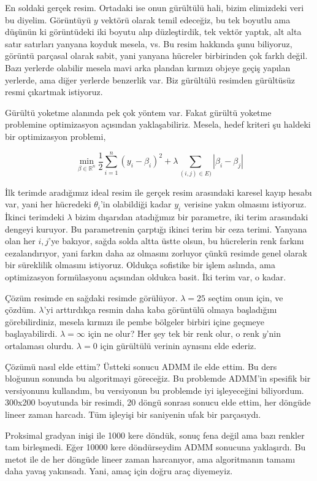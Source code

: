 \documentclass[12pt,fleqn]{article}\usepackage{../../common}
\begin{document}
En soldaki gerçek resim. Ortadaki ise onun gürültülü hali, bizim elimizdeki
veri bu diyelim. Görüntüyü $y$ vektörü olarak temil edeceğiz, bu tek
boyutlu ama düşünün ki görüntüdeki iki boyutu alıp düzleştirdik, tek vektör
yaptık, alt alta satır satırları yanyana koyduk mesela, vs. Bu resim
hakkında şunu biliyoruz, görüntü parçasal olarak sabit, yani yanyana
hücreler birbirinden çok farklı değil. Bazı yerlerde olabilir mesela mavi
arka plandan kırmızı objeye geçiş yapılan yerlerde, ama diğer yerlerde
benzerlik var. Biz gürültülü resimden gürültüsüz resmi çıkartmak istiyoruz.

Gürültü yoketme alanında pek çok yöntem var. Fakat gürültü yoketme
problemine optimizasyon açısından yaklaşabiliriz. Mesela, hedef kriteri şu
haldeki bir optimizasyon problemi,

$$
\min_{\beta \in \mathbb{R}^n} 
\frac{1}{2} \sum _{i=1}^{n} (y_i - \beta_i)^2 + 
\lambda \sum _{(i,j) \in E)}  |\beta_i - \beta_j|
$$

İlk terimde aradığımız ideal resim ile gerçek resim arasındaki karesel
kayıp hesabı var, yani her hücredeki $\theta_i$'in olabildiği kadar $y_i$
verisine yakın olmasını istiyoruz. İkinci terimdeki $\lambda$ bizim
dışarıdan atadığımız bir parametre, iki terim arasındaki dengeyi
kuruyor. Bu parametrenin çarptığı ikinci terim bir ceza terimi. Yanyana
olan her $i,j$'ye bakıyor, sağda solda altta üstte olsun, bu hücrelerin
renk farkını cezalandırıyor, yani farkın daha az olmasını zorluyor çünkü
resimde genel olarak bir süreklilik olmasını istiyoruz. Oldukça sofistike
bir işlem aslında, ama optimizasyon formülasyonu açısından oldukca
basit. İki terim var, o kadar.

Çözüm resimde en sağdaki resimde görülüyor. $\lambda=25$ seçtim onun için,
ve çözdüm. $\lambda$'yi arttırdıkça resmin daha kaba görüntülü olmaya
başladığını görebilirdiniz, mesela kırmızı ile pembe bölgeler birbiri içine
geçmeye başlayabilirdi. $\lambda=\infty$ için ne olur? Her şey tek bir renk
olur, o renk $y$'nin ortalaması olurdu. $\lambda=0$ için gürültülü verinin
aynısını elde ederiz. 

Çözümü nasıl elde ettim? Üstteki sonucu ADMM ile elde ettim. Bu ders
bloğunun sonunda bu algoritmayi göreceğiz. Bu problemde ADMM'in spesifik
bir versiyonunu kullandım, bu versiyonun bu problemde iyi işleyeceğini
biliyordum. 300x200 boyutunda bir resimdi, 20 döngü sonrası sonucu elde
ettim, her döngüde lineer zaman harcadı. Tüm işleyişi bir saniyenin ufak
bir parçasıydı. 

Proksimal gradyan inişi ile 1000 kere döndük, sonuç fena değil ama bazı
renkler tam birleşmedi. Eğer 10000 kere döndürseydim ADMM sonucuna
yaklaşırdı. Bu metot ile de her döngüde lineer zaman harcanıyor, ama
algoritmanın tamamı daha yavaş yakınsadı. Yani, amaç için doğru araç
diyemeyiz. 
\end{document}
